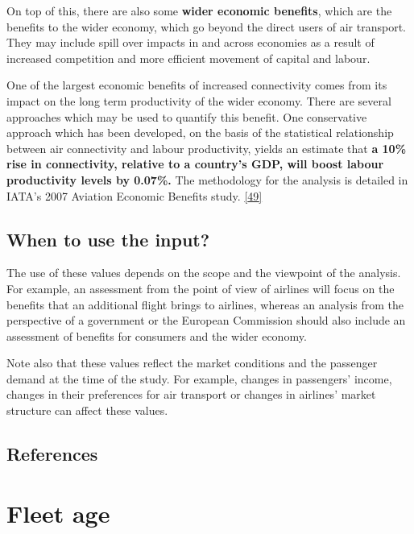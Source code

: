 \documentclass[
  11pt,
  a4paper,
]{book}
\begin{document}
On top of this, there are also some \textbf{wider economic benefits},
which are the benefits to the wider economy, which go beyond the direct
users of air transport. They may include spill over impacts in and
across economies as a result of increased competition and more efficient
movement of capital and labour.

One of the largest economic benefits of increased connectivity comes
from its impact on the long term productivity of the wider economy.
There are several approaches which may be used to quantify this benefit.
One conservative approach which has been developed, on the basis of the
statistical relationship between air connectivity and labour
productivity, yields an estimate that \textbf{a 10\% rise in
connectivity, relative to a country's GDP, will boost labour
productivity levels by 0.07\%.} The methodology for the analysis is
detailed in IATA's 2007 Aviation Economic Benefits study.
\protect\hyperlink{ref-iata:eco:benefit}{{[}49{]}}

\hypertarget{when-to-use-the-input-7}{%
\section{When to use the input?}\label{when-to-use-the-input-7}}

The use of these values depends on the scope and the viewpoint of the
analysis. For example, an assessment from the point of view of airlines
will focus on the benefits that an additional flight brings to airlines,
whereas an analysis from the perspective of a government or the European
Commission should also include an assessment of benefits for consumers
and the wider economy.

Note also that these values reflect the market conditions and the
passenger demand at the time of the study. For example, changes in
passengers' income, changes in their preferences for air transport or
changes in airlines' market structure can affect these values.

\hypertarget{references-22}{%
\section{References}\label{references-22}}

\hypertarget{sec-fleet-age}{%
\chapter{Fleet age}\label{sec-fleet-age}}
\end{document}
